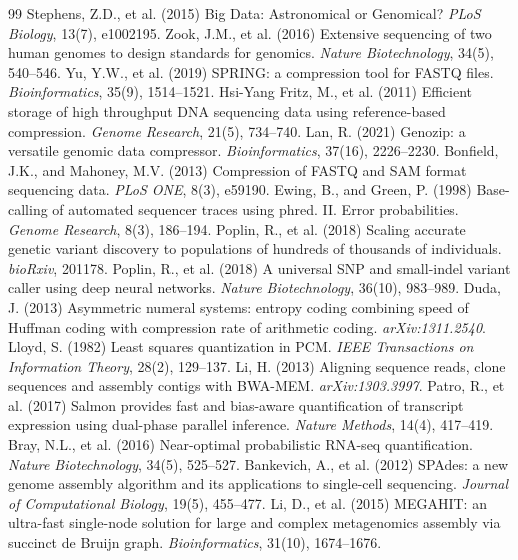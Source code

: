 \documentclass[10pt,twocolumn,a4paper]{article}
\begin{document}
\begin{thebibliography}{99}
 Stephens, Z.D., et al. (2015) Big Data: Astronomical or Genomical? \textit{PLoS Biology}, 13(7), e1002195.
 Zook, J.M., et al. (2016) Extensive sequencing of two human genomes to design standards for genomics. \textit{Nature Biotechnology}, 34(5), 540--546.
 Yu, Y.W., et al. (2019) SPRING: a compression tool for FASTQ files. \textit{Bioinformatics}, 35(9), 1514--1521.
 Hsi-Yang Fritz, M., et al. (2011) Efficient storage of high throughput DNA sequencing data using reference-based compression. \textit{Genome Research}, 21(5), 734--740.
 Lan, R. (2021) Genozip: a versatile genomic data compressor. \textit{Bioinformatics}, 37(16), 2226--2230.
 Bonfield, J.K., and Mahoney, M.V. (2013) Compression of FASTQ and SAM format sequencing data. \textit{PLoS ONE}, 8(3), e59190.
 Ewing, B., and Green, P. (1998) Base-calling of automated sequencer traces using phred. II. Error probabilities. \textit{Genome Research}, 8(3), 186--194.
 Poplin, R., et al. (2018) Scaling accurate genetic variant discovery to populations of hundreds of thousands of individuals. \textit{bioRxiv}, 201178.
 Poplin, R., et al. (2018) A universal SNP and small-indel variant caller using deep neural networks. \textit{Nature Biotechnology}, 36(10), 983--989.
 Duda, J. (2013) Asymmetric numeral systems: entropy coding combining speed of Huffman coding with compression rate of arithmetic coding. \textit{arXiv:1311.2540}.
 Lloyd, S. (1982) Least squares quantization in PCM. \textit{IEEE Transactions on Information Theory}, 28(2), 129--137.
 Li, H. (2013) Aligning sequence reads, clone sequences and assembly contigs with BWA-MEM. \textit{arXiv:1303.3997}.
 Patro, R., et al. (2017) Salmon provides fast and bias-aware quantification of transcript expression using dual-phase parallel inference. \textit{Nature Methods}, 14(4), 417--419.
 Bray, N.L., et al. (2016) Near-optimal probabilistic RNA-seq quantification. \textit{Nature Biotechnology}, 34(5), 525--527.
 Bankevich, A., et al. (2012) SPAdes: a new genome assembly algorithm and its applications to single-cell sequencing. \textit{Journal of Computational Biology}, 19(5), 455--477.
 Li, D., et al. (2015) MEGAHIT: an ultra-fast single-node solution for large and complex metagenomics assembly via succinct de Bruijn graph. \textit{Bioinformatics}, 31(10), 1674--1676.
\end{thebibliography}
\end{document}
